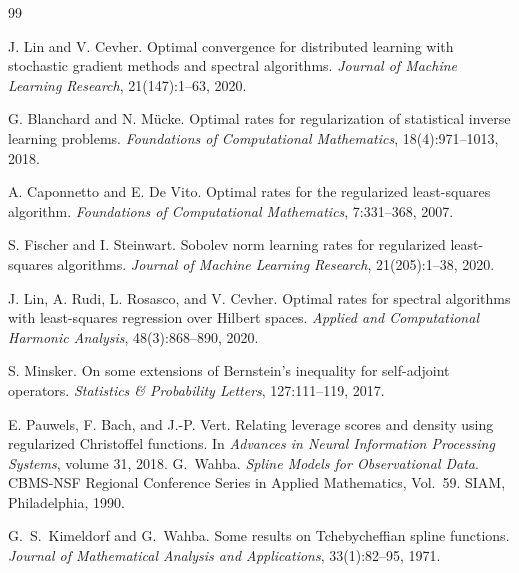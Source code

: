 \documentclass[11pt]{article}
\begin{document}
\begingroup
{}
\begin{thebibliography}{99}

J. Lin and V. Cevher.
\newblock Optimal convergence for distributed learning with stochastic gradient methods and spectral algorithms.
\newblock \emph{Journal of Machine Learning Research}, 21(147):1--63, 2020.

G. Blanchard and N. M\"ucke.
\newblock Optimal rates for regularization of statistical inverse learning problems.
\newblock \emph{Foundations of Computational Mathematics}, 18(4):971--1013, 2018.

A. Caponnetto and E. De Vito.
\newblock Optimal rates for the regularized least-squares algorithm.
\newblock \emph{Foundations of Computational Mathematics}, 7:331--368, 2007.

S. Fischer and I. Steinwart.
\newblock Sobolev norm learning rates for regularized least-squares algorithms.
\newblock \emph{Journal of Machine Learning Research}, 21(205):1--38, 2020.

J. Lin, A. Rudi, L. Rosasco, and V. Cevher.
\newblock Optimal rates for spectral algorithms with least-squares regression over Hilbert spaces.
\newblock \emph{Applied and Computational Harmonic Analysis}, 48(3):868--890, 2020.

S. Minsker.
\newblock On some extensions of Bernstein's inequality for self-adjoint operators.
\newblock \emph{Statistics \& Probability Letters}, 127:111--119, 2017.

E. Pauwels, F. Bach, and J.-P. Vert.
\newblock Relating leverage scores and density using regularized Christoffel functions.
\newblock In \emph{Advances in Neural Information Processing Systems}, volume 31, 2018.
G.~Wahba.
\newblock \emph{Spline Models for Observational Data}.
\newblock CBMS-NSF Regional Conference Series in Applied Mathematics, Vol.~59.
\newblock SIAM, Philadelphia, 1990.

G.~S.~Kimeldorf and G.~Wahba.
\newblock Some results on Tchebycheffian spline functions.
\newblock \emph{Journal of Mathematical Analysis and Applications},
33(1):82--95, 1971.

\end{thebibliography}
\endgroup
\end{document}
